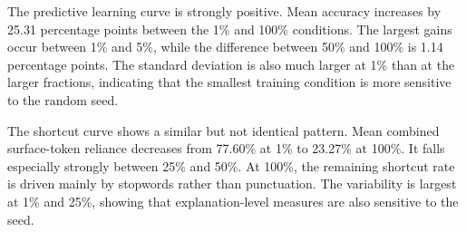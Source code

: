 \documentclass[11pt]{article}
\begin{document}
\begin{table}[htbp]
\centering
\small
\caption{Predictive performance and LIME shortcut rates.}
\label{tab:main-results}
%
\end{table}

The predictive learning curve is strongly positive. Mean accuracy increases by 25.31 percentage points between the 1\% and 100\% conditions. The largest gains occur between 1\% and 5\%, while the difference between 50\% and 100\% is 1.14 percentage points. The standard deviation is also much larger at 1\% than at the larger fractions, indicating that the smallest training condition is more sensitive to the random seed.

The shortcut curve shows a similar but not identical pattern. Mean combined surface-token reliance decreases from 77.60\% at 1\% to 23.27\% at 100\%. It falls especially strongly between 25\% and 50\%. At 100\%, the remaining shortcut rate is driven mainly by stopwords rather than punctuation. The variability is largest at 1\% and 25\%, showing that explanation-level measures are also sensitive to the seed.
\end{document}
